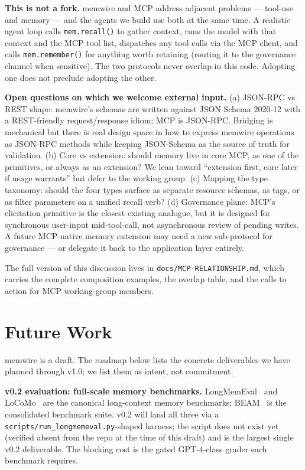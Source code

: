 \documentclass[11pt,letterpaper,twocolumn]{article}
\begin{document}
\textbf{This is not a fork.} memwire and MCP address adjacent problems --- tool-use and memory --- and the agents we build use both at the same time. A realistic agent loop calls \texttt{mem.recall()} to gather context, runs the model with that context and the MCP tool list, dispatches any tool calls via the MCP client, and calls \texttt{mem.remember()} for anything worth retaining (routing it to the governance channel when sensitive). The two protocols never overlap in this code. Adopting one does not preclude adopting the other.

\textbf{Open questions on which we welcome external input.} (a) JSON-RPC vs REST shape: memwire's schemas are written against JSON Schema 2020-12 with a REST-friendly request/response idiom; MCP is JSON-RPC. Bridging is mechanical but there is real design space in how to express memwire operations as JSON-RPC methods while keeping JSON-Schema as the source of truth for validation. (b) Core vs extension: should memory live in core MCP, as one of the primitives, or always as an extension? We lean toward ``extension first, core later if usage warrants'' but defer to the working group. (c) Mapping the type taxonomy: should the four types surface as separate resource schemas, as tags, or as filter parameters on a unified recall verb? (d) Governance plane: MCP's elicitation primitive is the closest existing analogue, but it is designed for synchronous user-input mid-tool-call, not asynchronous review of pending writes. A future MCP-native memory extension may need a new sub-protocol for governance --- or delegate it back to the application layer entirely.

The full version of this discussion lives in \texttt{docs/MCP-RELATIONSHIP.md}, which carries the complete composition examples, the overlap table, and the calls to action for MCP working-group members.

\section{Future Work}
\label{sec:future}

memwire is a draft. The roadmap below lists the concrete deliverables we have planned through v1.0; we list them as intent, not commitment.

\textbf{v0.2 evaluation: full-scale memory benchmarks.} LongMemEval~\cite{wu2024longmemeval} and LoCoMo~\cite{maharana2024locomo} are the canonical long-context memory benchmarks; BEAM~\cite{beam_benchmark} is the consolidated benchmark suite. v0.2 will land all three via a \texttt{scripts/run\_longmemeval.py}-shaped harness; the script does not exist yet (verified absent from the repo at the time of this draft) and is the largest single v0.2 deliverable. The blocking cost is the gated GPT-4-class grader each benchmark requires.
\end{document}
